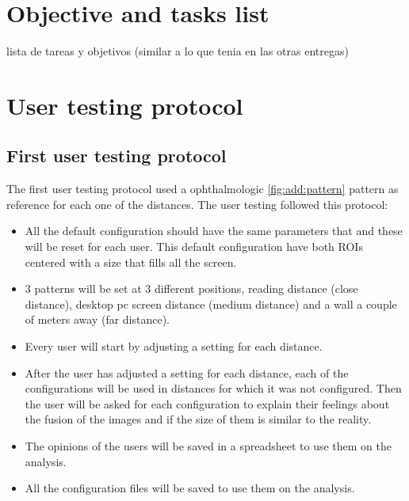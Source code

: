 \documentclass[10pt,a4paper,twocolumn,twoside]{article}
\begin{document}
	
	
	
	\appendix
	
	\section{Objective and tasks list}
	lista de tareas y objetivos (similar a lo que tenia en las otras entregas)
	
	\section{User testing protocol}
	\subsection{First user testing protocol}
	\label{sec:annex:user1}
	The first user testing protocol used a ophthalmologic \ref{fig:add:pattern} pattern as reference for each one of the distances. The user testing followed this protocol: 
	
	\begin{itemize}
		\item All the default configuration should have the same parameters that and these will be reset for each user. This default configuration have both ROIs centered with a size that fills all the screen. 
		
		\item 3 patterns will be set at 3 different positions, reading distance (close distance), desktop pc screen distance (medium distance) and a wall a couple of meters away (far distance).
		
		\item Every user will start by adjusting a setting for each distance. 
		
		\item After the user has adjusted a setting for each distance, each of the configurations will be used in distances for which it was not configured. Then the user will be asked for each configuration to explain their feelings about the fusion of the images and if the size of them is similar to the reality.  
		
		\item The opinions of the users will be saved in a spreadsheet to use them on the analysis. 
		
		\item All the configuration files will be saved to use them on the analysis. 
	\end{itemize}
	
\end{document}
